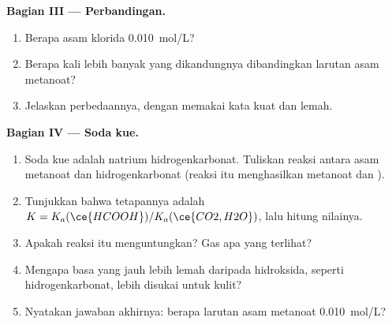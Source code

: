 \begin{problem}
\medskip
\noindent\textbf{Bagian III --- Perbandingan.}
\begin{enumerate}[resume]
  \item Berapa  asam klorida \qty{0.010}{mol/L}?
  \item Berapa kali lebih banyak  yang dikandungnya
        dibandingkan larutan asam metanoat?
  \item Jelaskan perbedaannya, dengan memakai kata kuat dan lemah.
\end{enumerate}

\medskip
\noindent\textbf{Bagian IV --- Soda kue.}
\begin{enumerate}[resume]
  \item Soda kue adalah natrium hidrogenkarbonat. Tuliskan reaksi antara
        asam metanoat dan  hidrogenkarbonat (reaksi itu menghasilkan
        metanoat dan ).
  \item Tunjukkan bahwa tetapannya adalah
        $K = K_a(\ce{HCOOH}) / K_a(\ce{CO2,H2O})$, lalu hitung nilainya.
  \item Apakah reaksi itu menguntungkan? Gas apa yang terlihat?
  \item Mengapa basa yang jauh lebih lemah daripada hidroksida, seperti
        hidrogenkarbonat, lebih disukai untuk kulit?
  \item Nyatakan jawaban akhirnya: berapa  larutan asam metanoat
        \qty{0.010}{mol/L}?
\end{enumerate}
\end{problem}
